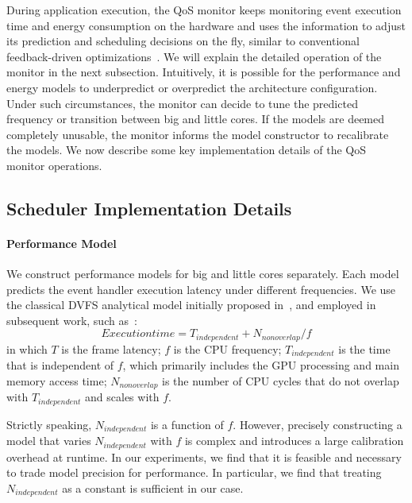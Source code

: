 During application execution, the QoS monitor keeps monitoring event execution time and energy consumption on the hardware and uses the information to adjust its prediction and scheduling decisions on the fly, similar to conventional feedback-driven optimizations~\cite{FDO}. We will explain the detailed operation of the monitor in the next subsection. Intuitively, it is possible for the performance and energy models to underpredict or overpredict the architecture configuration. Under such circumstances, the monitor can decide to tune the predicted frequency or transition between big and little cores. If the models are deemed completely unusable, the monitor informs the model constructor to recalibrate the models. We now describe some key implementation details of the QoS monitor operations.

\subsection{Scheduler Implementation Details}
\label{sec:runtime:ebs:sched}

\paragraph{Performance Model} We construct performance models for big and little cores separately. Each model predicts the event handler execution latency under different frequencies. We use the classical DVFS analytical model initially proposed in~\cite{dvfs_model}, and employed in subsequent work, such as~\cite{dvfs_power}:
\begin{equation}\label{eq:dvfs}  Execution time = T_{independent} + N_{nonoverlap}/f
\end{equation}
\noindent in which $T$ is the frame latency; $f$ is the CPU frequency; $T_{independent}$ is the time that is independent of $f$, which primarily includes the GPU processing and main memory access time; $N_{nonoverlap}$ is the number of CPU cycles that do not overlap with $T_{independent}$ and scales with $f$.

Strictly speaking, $N_{independent}$ is a function of $f$. However, precisely constructing a model that varies $N_{independent}$ with $f$ is complex and introduces a large calibration overhead at runtime. In our experiments, we find that it is feasible and necessary to trade model precision for performance. In particular, we find that treating $N_{independent}$ as a constant is sufficient in our case.


